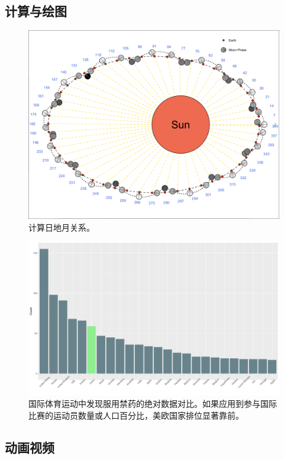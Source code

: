 \documentclass[]{scrbook}
\begin{document}
\hypertarget{ux8ba1ux7b97ux4e0eux7ed8ux56fe}{%
\subsection*{计算与绘图}\label{ux8ba1ux7b97ux4e0eux7ed8ux56fe}}

\begin{figure}
\centering
\includegraphics{Fig/fig4.png}
\caption{计算日地月关系。}
\end{figure}

\begin{figure}
\centering
\includegraphics{Fig/fig6.png}
\caption{国际体育运动中发现服用禁药的绝对数据对比。如果应用到参与国际比赛的运动员数量或人口百分比，美欧国家排位显著靠前。}
\end{figure}

\hypertarget{ux52a8ux753bux89c6ux9891}{%
\subsection*{动画视频}\label{ux52a8ux753bux89c6ux9891}}
\end{document}

